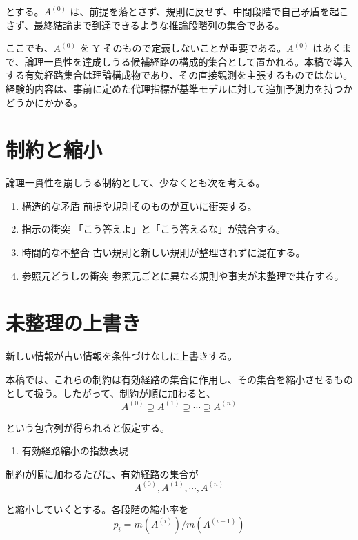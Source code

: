 \documentclass[12pt,a4paper]{article}
\begin{document}
とする。\(A^{(0)}\) は、前提を落とさず、規則に反せず、中間段階で自己矛盾を起こさず、最終結論まで到達できるような推論段階列の集合である。

ここでも、\(A^{(0)}\) を Y そのもので定義しないことが重要である。\(A^{(0)}\) はあくまで、論理一貫性を達成しうる候補経路の構成的集合として置かれる。本稿で導入する有効経路集合は理論構成物であり、その直接観測を主張するものではない。経験的内容は、事前に定めた代理指標が基準モデルに対して追加予測力を持つかどうかにかかる。

\section{制約と縮小}\label{ux5236ux7d04ux3068ux7e2eux5c0f}

論理一貫性を崩しうる制約として、少なくとも次を考える。

\begin{enumerate}
\def\labelenumi{\arabic{enumi}.}
\item
  構造的な矛盾 前提や規則そのものが互いに衝突する。
\item
  指示の衝突 「こう答えよ」と「こう答えるな」が競合する。
\item
  時間的な不整合 古い規則と新しい規則が整理されずに混在する。
\item
  参照元どうしの衝突 参照元ごとに異なる規則や事実が未整理で共存する。
\end{enumerate}

\section{未整理の上書き}\label{ux672aux6574ux7406ux306eux4e0aux66f8ux304d}

新しい情報が古い情報を条件づけなしに上書きする。

本稿では、これらの制約は有効経路の集合に作用し、その集合を縮小させるものとして扱う。したがって、制約が順に加わると、 \[
A^{(0)} \supseteq A^{(1)} \supseteq \cdots \supseteq A^{(n)}
\]

という包含列が得られると仮定する。

\begin{enumerate}
\def\labelenumi{\arabic{enumi}.}
\setcounter{enumi}{4}
\tightlist
\item
  有効経路縮小の指数表現
\end{enumerate}

制約が順に加わるたびに、有効経路の集合が \[
A^{(0)}, A^{(1)}, \cdots, A^{(n)}
\]

と縮小していくとする。各段階の縮小率を \[
p_{i} = m(A^{(i)}) / m(A^{(i-1)})
\]
\end{document}
